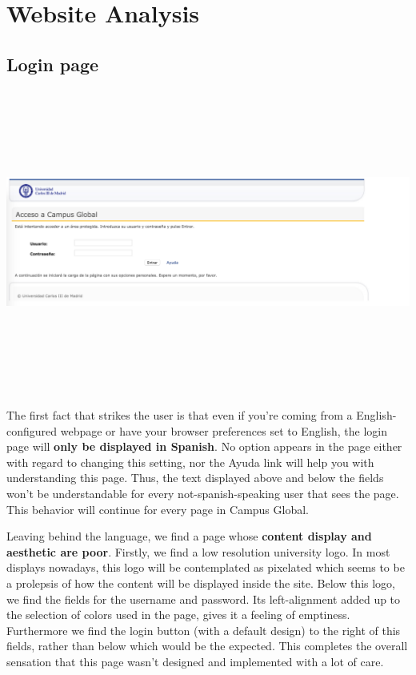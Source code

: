\documentclass{article}
\begin{document}
\section{Website Analysis}
\subsection{Login page}

\includegraphics[width=15cm, height=10cm, keepaspectratio]{loginpage} 


The first fact that strikes the user is that even if you’re coming from a English-configured webpage or have your browser preferences set to English, the login page will \textbf{only be displayed in Spanish}. No option appears in the page either with regard to changing this setting, nor the Ayuda link will help you with understanding this page. Thus, the text displayed above and below the fields won’t be understandable for every not-spanish-speaking user that sees the page. This behavior will continue for every page in Campus Global.


Leaving behind the language, we find a page whose \textbf{content display and aesthetic are poor}.
Firstly, we find a low resolution university logo. In most displays nowadays, this logo will be contemplated as pixelated which seems to be a prolepsis of how the content will be displayed inside the site. 
Below this logo, we find the fields for the username and password. Its left-alignment added up to the selection of colors used in the page, gives it a feeling of emptiness. Furthermore we find the login button (with a default design) to the right of this fields, rather than below which would be the expected. This completes the overall sensation that this page wasn't designed and implemented with a lot of care.
\end{document}
